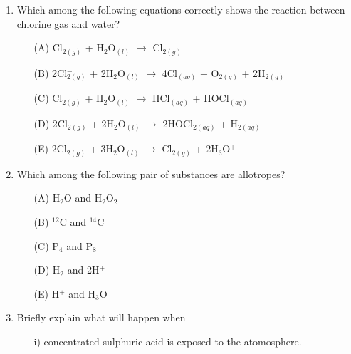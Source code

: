 \begin{enumerate}
	\item Which among the following equations correctly shows the reaction between chlorine gas and water?
	\begin{enumerate}[topsep=0ex,itemsep=0ex,partopsep=1ex,parsep=1ex]
		\item[(A)] Cl$_{2 (g)}$ + H$_2$O$_{(l)}$ $\rightarrow$ Cl$_{2 (g)}$
		\item[(B)] 2Cl$_{2 (g)}^-$ + 2H$_2$O$_{(l)}$ $\rightarrow$ 4Cl$_{(aq)}$ + O$_{2 (g)}$ + 2H$_{2 (g)}$
		\item[(C)] Cl$_{2 (g)}$ + H$_2$O$_{(l)}$ $\rightarrow$ HCl$_{(aq)}$ + HOCl$_{(aq)}$
		\item[(D)] 2Cl$_{2 (g)}$ + 2H$_2$O$_{(l)}$ $\rightarrow$ 2HOCl$_{2 (aq)}$ + H$_{2 (aq)}$
		\item[(E)] 2Cl$_{2 (g)}$ + 3H$_2$O$_{(l)}$ $\rightarrow$ Cl$_{2 (g)}$ + 2H$_3$O$^+$
	\end{enumerate}
	
	\item Which among the following pair of substances are allotropes?
	\begin{enumerate}[topsep=0ex,itemsep=0ex,partopsep=1ex,parsep=1ex]
		\item[(A)] H$_2$O and H$_2$O$_2$
		\item[(B)] $^12$C and $^14$C
		\item[(C)] P$_4$ and P$_8$
		\item[(D)] H$_2$ and 2H$^+$
		\item[(E)] H$^+$ and H$_3$O
	\end{enumerate}
	
	\item Briefly explain what will happen when 
	\begin{enumerate}[topsep=0ex,itemsep=0ex,partopsep=1ex,parsep=1ex]
		\item[i)] concentrated sulphuric acid is exposed to the atomosphere.
	\end{enumerate}

\end{enumerate}







